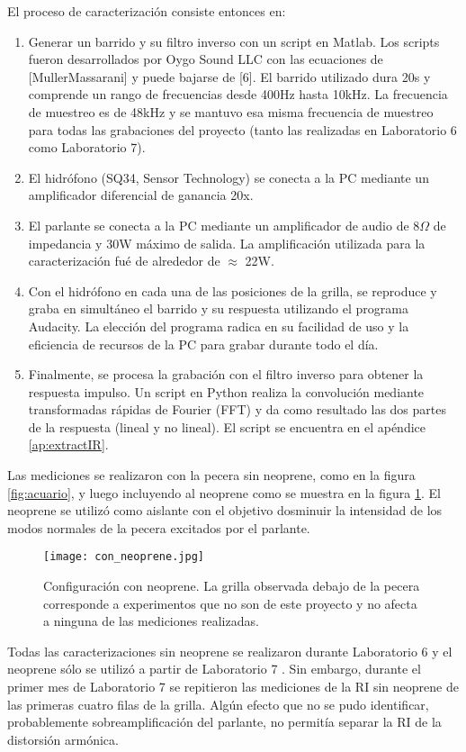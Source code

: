 El proceso de caracterización consiste entonces en:
\begin{enumerate}
	\item Generar un barrido y su filtro inverso con un script en Matlab. Los scripts fueron desarrollados por Oygo Sound LLC con las ecuaciones de [MullerMassarani] y puede bajarse de [6]. El barrido utilizado dura 20s y comprende un rango de frecuencias desde 400Hz hasta 10kHz. La frecuencia de muestreo es de 48kHz y se mantuvo esa misma frecuencia de muestreo para todas las grabaciones del proyecto (tanto las realizadas en Laboratorio 6 como Laboratorio 7).
	\item El hidrófono (SQ34, Sensor Technology) se conecta a la PC mediante un amplificador diferencial de ganancia 20x.
	\item El parlante se conecta a la PC mediante un amplificador de audio de 8$\Omega$ de impedancia y 30W máximo de salida. La amplificación utilizada para la caracterización fué de alrededor de $\approx$ 22W.
	\item Con el hidrófono en cada una de las posiciones de la grilla, se reproduce y graba en simultáneo el barrido y su respuesta utilizando el programa Audacity. La elección del programa radica en su facilidad de uso y la eficiencia de recursos de la PC para grabar durante todo el día.
	\item Finalmente, se procesa la grabación con el filtro inverso para obtener la respuesta impulso. Un script en Python realiza la convolución mediante transformadas rápidas de Fourier (FFT) y da como resultado las dos partes de la respuesta (lineal y no lineal). El script se encuentra en el apéndice \ref{ap:extractIR}.
\end{enumerate}

Las mediciones se realizaron con la pecera sin neoprene, como en la figura \ref{fig:acuario}, y luego incluyendo al neoprene como se muestra en la figura \ref{fig:conneo}. El neoprene se utilizó como aislante con el objetivo dosminuir la intensidad de los modos normales de la pecera excitados por el parlante.

\begin{figure}[H]
	\centering
		\texttt{[image: con\_neoprene.jpg]}
		\caption{Configuración con neoprene. La grilla observada debajo de la pecera corresponde a experimentos que no son de este proyecto y no afecta a ninguna de las mediciones realizadas.}
	\label{fig:conneo}
\end{figure}

Todas las caracterizaciones sin neoprene se realizaron durante Laboratorio 6 y el neoprene sólo se utilizó a partir de Laboratorio 7 . Sin embargo, durante el primer mes de Laboratorio 7 se repitieron las mediciones de la RI sin neoprene de las primeras cuatro filas de la grilla. Algún efecto que no se pudo identificar, probablemente sobreamplificación del parlante, no permitía separar la RI de la distorsión armónica.

